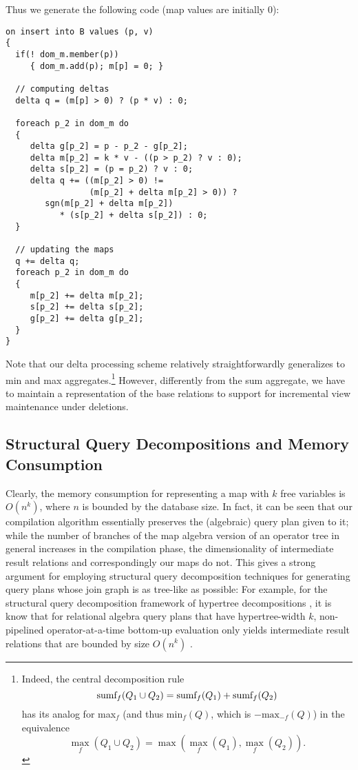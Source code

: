 \begin{example}
Thus we generate the following code (map values are initially 0):
\begin{verbatim}
on insert into B values (p, v)
{
  if(! dom_m.member(p))
     { dom_m.add(p); m[p] = 0; }

  // computing deltas
  delta q = (m[p] > 0) ? (p * v) : 0;

  foreach p_2 in dom_m do
  {
     delta g[p_2] = p - p_2 - g[p_2];
     delta m[p_2] = k * v - ((p > p_2) ? v : 0);
     delta s[p_2] = (p = p_2) ? v : 0;
     delta q += ((m[p_2] > 0) !=
                 (m[p_2] + delta m[p_2] > 0)) ?
        sgn(m[p_2] + delta m[p_2])
           * (s[p_2] + delta s[p_2]) : 0;
  }

  // updating the maps
  q += delta q;
  foreach p_2 in dom_m do
  {
     m[p_2] += delta m[p_2];
     s[p_2] += delta s[p_2];
     g[p_2] += delta g[p_2];
  }
}
\end{verbatim}
%
\end{example}


Note that our delta processing scheme relatively straightforwardly generalizes
to min and max aggregates.\footnote{Indeed, the central decomposition rule
\[
\mbox{sumf}_f(Q_1 \cup Q_2) = \mbox{sumf}_f(Q_1) + \mbox{sumf}_f(Q_2)
\]
has its analog for max$_f$ (and thus min$_f(Q)$, which is $-\mbox{max}_{-f}(Q)$) in
the equivalence
\[
\max_f(Q_1 \cup Q_2) = \max(\max_f(Q_1), \max_f(Q_2)).
\]
}
However, differently from the sum aggregate, we have to
maintain a representation of the base relations to support for incremental view
maintenance under deletions. 




\subsection{Structural Query Decompositions and Memory Consumption}


Clearly, the memory consumption for representing a map with $k$ free
variables is
$O(n^k)$, where $n$ is bounded by the database size. In fact, it can be
seen that our compilation algorithm essentially preserves the (algebraic)
query plan given to it; while the number of branches of the map algebra
version of an operator tree in general increases in the compilation phase, the
dimensionality of intermediate result relations and correspondingly our maps
do not. This gives a strong argument for employing structural query decomposition techniques for generating query plans whose join graph is
as tree-like as possible: For example, for the structural query decomposition framework of hypertree decompositions \cite{GLS2002}, it is know that for relational algebra query plans that have hypertree-width $k$, non-pipelined operator-at-a-time bottom-up evaluation only yields intermediate result relations that are bounded by size $O(n^k)$ \cite{GLS2002}.

